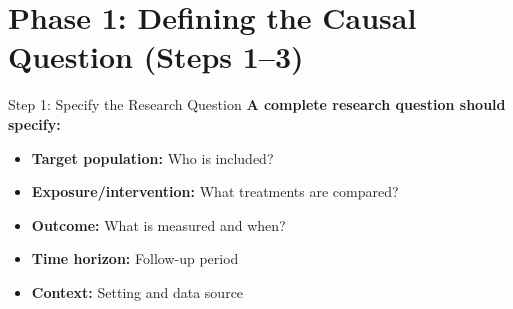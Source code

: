 \documentclass[aspectratio=169]{beamer}
\begin{document}
\section{Phase 1: Defining the Causal Question (Steps 1--3)}

\begin{frame}{Step 1: Specify the Research Question}
  \small
  \textbf{A complete research question should specify:}
  \begin{itemize}
    \item \textbf{Target population:} Who is included?
    \item \textbf{Exposure/intervention:} What treatments are compared?
    \item \textbf{Outcome:} What is measured and when?
    \item \textbf{Time horizon:} Follow-up period
    \item \textbf{Context:} Setting and data source
  \end{itemize}

\end{frame}
\end{document}
